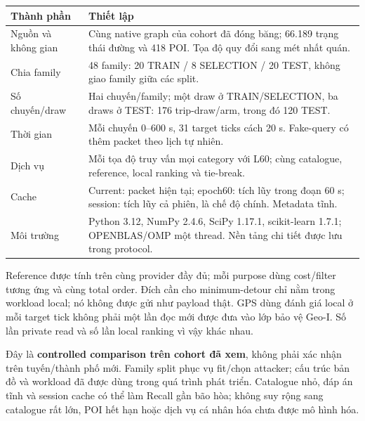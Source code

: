 \begin{tabularx}{\linewidth}{@{}P{4.2cm}Y@{}}\toprule
\textbf{Thành phần} & \textbf{Thiết lập}\\\midrule
Nguồn và không gian & Cùng native graph của cohort đã đóng băng; 66.189 trạng thái đường và 418 POI. Tọa độ quy đổi sang mét nhất quán.\\
Chia family & 48 family: 20 TRAIN / 8 SELECTION / 20 TEST, không giao family giữa các split.\\
Số chuyến/draw & Hai chuyến/family; một draw ở TRAIN/SELECTION, ba draws ở TEST: 176 trip-draw/arm, trong đó 120 TEST.\\
Thời gian & Mỗi chuyến 0--600 s, 31 target ticks cách 20 s. Fake-query có thêm packet theo lịch tự nhiên.\\
Dịch vụ & Mỗi tọa độ truy vấn mọi category với L60; cùng catalogue, reference, local ranking và tie-break.\\
Cache & Current: packet hiện tại; epoch60: tích lũy trong đoạn 60 s; session: tích lũy cả phiên, là chế độ chính. Metadata tĩnh.\\
Môi trường & Python 3.12, NumPy 2.4.6, SciPy 1.17.1, scikit-learn 1.7.1; OPENBLAS/OMP một thread. Nền tảng chi tiết được lưu trong protocol.\\\bottomrule
\end{tabularx}

Reference được tính trên cùng provider đầy đủ; mỗi purpose dùng cost/filter tương ứng và cùng total order.
Đích cần cho minimum-detour chỉ nằm trong workload local; nó không được gửi như payload thật.
GPS dùng đánh giá local ở mỗi target tick không phải một lần đọc mới được đưa vào lớp bảo vệ Geo-I.
Số lần private read và số lần local ranking vì vậy khác nhau.

Đây là \textbf{controlled comparison trên cohort đã xem}, không phải xác nhận trên tuyến/thành phố mới.
Family split phục vụ fit/chọn attacker; cấu trúc bản đồ và workload đã được dùng trong quá trình phát triển.
Catalogue nhỏ, đáp án tĩnh và session cache có thể làm Recall gần bão hòa; không suy rộng sang catalogue rất lớn,
POI hết hạn hoặc dịch vụ cá nhân hóa chưa được mô hình hóa.

